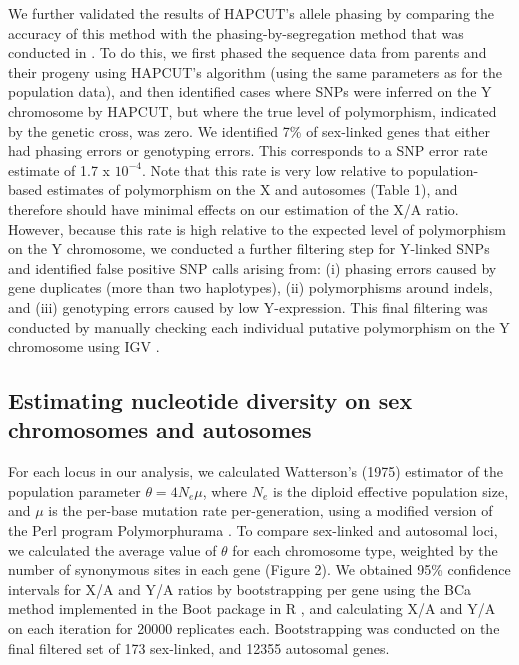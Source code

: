 \documentclass[9pt,twocolumn,twoside]{gsajnl}
\begin{document}
We further validated the results of HAPCUT’s allele phasing by comparing the accuracy of this method with the phasing-by-segregation method that was conducted in \citet{hough2014}. To do this, we first phased the sequence data from parents and their progeny using HAPCUT’s algorithm (using the same parameters as for the population data), and then identified cases where SNPs were inferred on the Y chromosome by HAPCUT, but where the true level of polymorphism, indicated by the genetic cross, was zero. We identified 7\% of sex-linked genes that either had phasing errors or genotyping errors. This corresponds to a SNP error rate estimate of 1.7 x $10^{-4}$. Note that this rate is very low relative to population-based estimates of polymorphism on the X and autosomes (Table 1), and therefore should have minimal effects on our estimation of the X/A ratio. However, because this rate is high relative to the expected level of polymorphism on the Y chromosome, we conducted a further filtering step for Y-linked SNPs and identified false positive SNP calls arising from: (i) phasing errors caused by gene duplicates (more than two haplotypes), (ii) polymorphisms around indels, and (iii) genotyping errors caused by low Y-expression. This final filtering was conducted by manually checking each individual putative polymorphism on the Y chromosome using IGV \citep{robinson2011integrative}.

\subsection*{Estimating nucleotide diversity on sex chromosomes and autosomes}
For each locus in our analysis, we calculated Watterson’s (1975) estimator of the population parameter $\theta=4N_{e}\mu$, where $N_{e}$ is the diploid effective population size, and $\mu$ is the per-base mutation rate per-generation, using a modified version of the Perl program Polymorphurama \citep{bachtrog2006}. To compare sex-linked and autosomal loci, we calculated the average value of $\theta$ for each chromosome type, weighted by the number of synonymous sites in each gene (\X Figure 2). We obtained 95\% confidence intervals for X/A and Y/A ratios by bootstrapping per gene using the BCa method \citep{efron1994} implemented in the Boot package in R \citep{canty2012boot}, and calculating X/A and Y/A on each iteration for 20000 replicates each. Bootstrapping was conducted on the final filtered set of 173 sex-linked, and 12355 autosomal genes.
\end{document}
